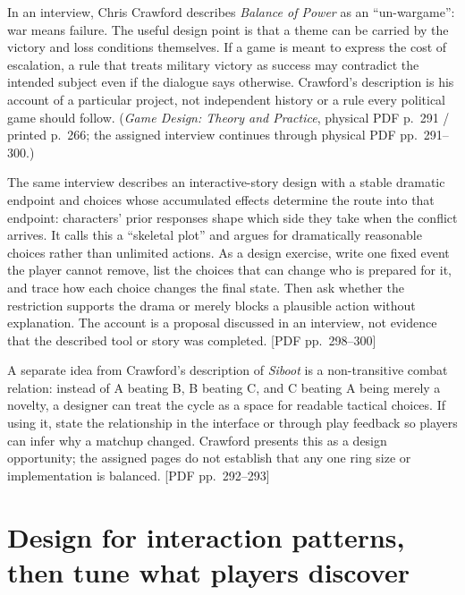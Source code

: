 \hypertarget{06-engine-ii-ch047-put-the-theme-in-the-objective-then-bound-the-choices}{}

In an interview, Chris Crawford describes \emph{Balance of Power} as an ``un-wargame'': war means failure. The useful design point is that a theme can be carried by the victory and loss conditions themselves. If a game is meant to express the cost of escalation, a rule that treats military victory as success may contradict the intended subject even if the dialogue says otherwise. Crawford's description is his account of a particular project, not independent history or a rule every political game should follow. (\emph{Game Design: Theory and Practice}, physical PDF p.~291 / printed p.~266; the assigned interview continues through physical PDF pp.~291--300.)

The same interview describes an interactive-story design with a stable dramatic endpoint and choices whose accumulated effects determine the route into that endpoint: characters' prior responses shape which side they take when the conflict arrives. It calls this a ``skeletal plot'' and argues for dramatically reasonable choices rather than unlimited actions. As a design exercise, write one fixed event the player cannot remove, list the choices that can change who is prepared for it, and trace how each choice changes the final state. Then ask whether the restriction supports the drama or merely blocks a plausible action without explanation. The account is a proposal discussed in an interview, not evidence that the described tool or story was completed. {[}PDF pp.~298--300{]}

A separate idea from Crawford's description of \emph{Siboot} is a non-transitive combat relation: instead of A beating B, B beating C, and C beating A being merely a novelty, a designer can treat the cycle as a space for readable tactical choices. If using it, state the relationship in the interface or through play feedback so players can infer why a matchup changed. Crawford presents this as a design opportunity; the assigned pages do not establish that any one ring size or implementation is balanced. {[}PDF pp.~292--293{]}

\section{Design for interaction patterns, then tune what players discover}\label{06-engine-ii-ch047-design-for-interaction-patterns-then-tune-what-players-discover}

